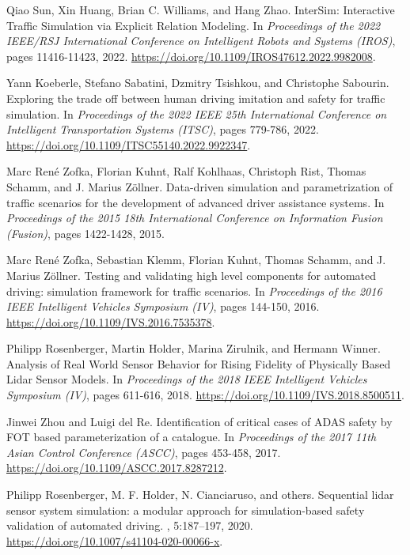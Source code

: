 \documentclass[lettersize,journal]{IEEEtran}
\begin{document}
\begin{thebibliography}{1}
Qiao Sun, Xin Huang, Brian C. Williams, and Hang Zhao.
\newblock InterSim: Interactive Traffic Simulation via Explicit Relation Modeling.
\newblock In {\em Proceedings of the 2022 IEEE/RSJ International Conference on Intelligent Robots and Systems (IROS)}, pages 11416-11423, 2022.
\newblock \url{https://doi.org/10.1109/IROS47612.2022.9982008}.

Yann Koeberle, Stefano Sabatini, Dzmitry Tsishkou, and Christophe Sabourin.
\newblock Exploring the trade off between human driving imitation and safety for traffic simulation.
\newblock In {\em Proceedings of the 2022 IEEE 25th International Conference on Intelligent Transportation Systems (ITSC)}, pages 779-786, 2022.
\newblock \url{https://doi.org/10.1109/ITSC55140.2022.9922347}.

Marc René Zofka, Florian Kuhnt, Ralf Kohlhaas, Christoph Rist, Thomas Schamm, and J. Marius Zöllner.
\newblock Data-driven simulation and parametrization of traffic scenarios for the development of advanced driver assistance systems.
\newblock In {\em Proceedings of the 2015 18th International Conference on Information Fusion (Fusion)}, pages 1422-1428, 2015.

Marc René Zofka, Sebastian Klemm, Florian Kuhnt, Thomas Schamm, and J. Marius Zöllner.
\newblock Testing and validating high level components for automated driving: simulation framework for traffic scenarios.
\newblock In {\em Proceedings of the 2016 IEEE Intelligent Vehicles Symposium (IV)}, pages 144-150, 2016.
\newblock \url{https://doi.org/10.1109/IVS.2016.7535378}.

Philipp Rosenberger, Martin Holder, Marina Zirulnik, and Hermann Winner.
\newblock Analysis of Real World Sensor Behavior for Rising Fidelity of Physically Based Lidar Sensor Models.
\newblock In {\em Proceedings of the 2018 IEEE Intelligent Vehicles Symposium (IV)}, pages 611-616, 2018.
\newblock \url{https://doi.org/10.1109/IVS.2018.8500511}.

Jinwei Zhou and Luigi del Re.
\newblock Identification of critical cases of ADAS safety by FOT based parameterization of a catalogue.
\newblock In {\em Proceedings of the 2017 11th Asian Control Conference (ASCC)}, pages 453-458, 2017.
\newblock \url{https://doi.org/10.1109/ASCC.2017.8287212}.

Philipp Rosenberger, M. F. Holder, N. Cianciaruso, and others.
\newblock Sequential lidar sensor system simulation: a modular approach for simulation-based safety validation of automated driving.
, 5:187–197, 2020.
\newblock \url{https://doi.org/10.1007/s41104-020-00066-x}.


\end{thebibliography}
\end{document}
